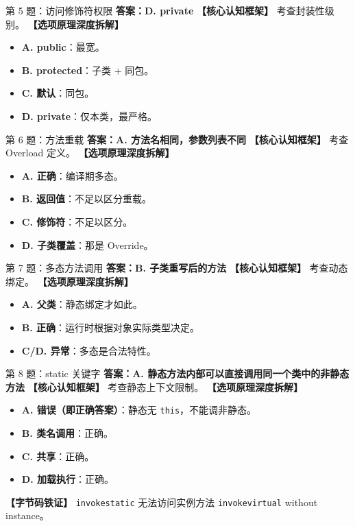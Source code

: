 ﻿\documentclass[12pt, a4paper]{ctexart}
\begin{document}
\begin{bluebox}{第 5 题：访问修饰符权限}
	\textbf{答案：D. private}
	\textbf{【核心认知框架】} 考查封装性级别。
	\textbf{【选项原理深度拆解】}
	\begin{itemize}[leftmargin=*, nosep]
		\item \textbf{A. public}：最宽。
		\item \textbf{B. protected}：子类 + 同包。
		\item \textbf{C. 默认}：同包。
		\item \textbf{D. private}：仅本类，最严格。
	\end{itemize}
\end{bluebox}

\begin{bluebox}{第 6 题：方法重载}
	\textbf{答案：A. 方法名相同，参数列表不同}
	\textbf{【核心认知框架】} 考查 Overload 定义。
	\textbf{【选项原理深度拆解】}
	\begin{itemize}[leftmargin=*, nosep]
		\item \textbf{A. 正确}：编译期多态。
		\item \textbf{B. 返回值}：不足以区分重载。
		\item \textbf{C. 修饰符}：不足以区分。
		\item \textbf{D. 子类覆盖}：那是 Override。
	\end{itemize}
\end{bluebox}

\begin{bluebox}{第 7 题：多态方法调用}
	\textbf{答案：B. 子类重写后的方法}
	\textbf{【核心认知框架】} 考查动态绑定。
	\textbf{【选项原理深度拆解】}
	\begin{itemize}[leftmargin=*, nosep]
		\item \textbf{A. 父类}：静态绑定才如此。
		\item \textbf{B. 正确}：运行时根据对象实际类型决定。
		\item \textbf{C/D. 异常}：多态是合法特性。
	\end{itemize}
\end{bluebox}

\begin{bluebox}{第 8 题：static 关键字}
	\textbf{答案：A. 静态方法内部可以直接调用同一个类中的非静态方法}
	\textbf{【核心认知框架】} 考查静态上下文限制。
	\textbf{【选项原理深度拆解】}
	\begin{itemize}[leftmargin=*, nosep]
		\item \textbf{A. 错误（即正确答案）}：静态无 \texttt{this}，不能调非静态。
		\item \textbf{B. 类名调用}：正确。
		\item \textbf{C. 共享}：正确。
		\item \textbf{D. 加载执行}：正确。
	\end{itemize}
	\textbf{【字节码铁证】} \texttt{invokestatic} 无法访问实例方法 \texttt{invokevirtual} without instance。
\end{bluebox}
\end{document}
